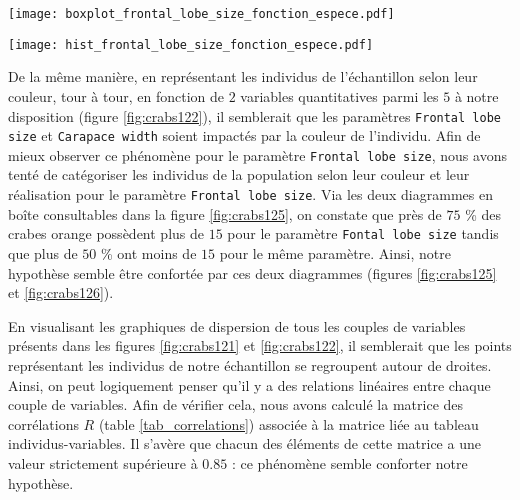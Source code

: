 \documentclass{article}
\begin{document}
\begin{multicols}{2}

\begingroup
    \centering
   \texttt{[image: boxplot\_frontal\_lobe\_size\_fonction\_espece.pdf]}
    \label{fig:crabs125}
\endgroup

\begingroup
    \centering
   \texttt{[image: hist\_frontal\_lobe\_size\_fonction\_espece.pdf]}
    \label{fig:crabs126}
\endgroup


De la même manière, en représentant les individus de l'échantillon selon leur couleur, tour à tour, en fonction de $2$ variables quantitatives parmi les $5$ à notre disposition (figure \ref{fig:crabs122}), il semblerait que les paramètres \texttt{Frontal lobe size} et \texttt{Carapace width} soient impactés par la couleur de l'individu. Afin de mieux observer ce phénomène pour le paramètre \texttt{Frontal lobe size}, nous avons tenté de catégoriser les individus de la population selon leur couleur et leur réalisation pour le paramètre \texttt{Frontal lobe size}. Via les deux diagrammes en boîte consultables dans la figure \ref{fig:crabs125}, on constate que près de $75$ \% des crabes orange possèdent plus de $15$ pour le paramètre \texttt{Fontal lobe size} tandis que plus de $50$ \% ont moins de $15$ pour le même paramètre. Ainsi, notre hypothèse semble être confortée par ces deux diagrammes (figures \ref{fig:crabs125} et \ref{fig:crabs126}).

En visualisant les graphiques de dispersion de tous les couples de variables présents dans les figures \ref{fig:crabs121} et \ref{fig:crabs122}, il semblerait que les points représentant les individus de notre échantillon se regroupent autour de droites. Ainsi, on peut logiquement penser qu'il y a des relations linéaires entre chaque couple de variables. Afin de vérifier cela, nous avons calculé la matrice des corrélations $R$ (table \ref{tab_correlations}) associée à la matrice liée au tableau individus-variables. Il s'avère que chacun des éléments de cette matrice a une valeur strictement supérieure à $0.85$ :  ce phénomène semble conforter notre hypothèse.  


\end{multicols}
\end{document}

